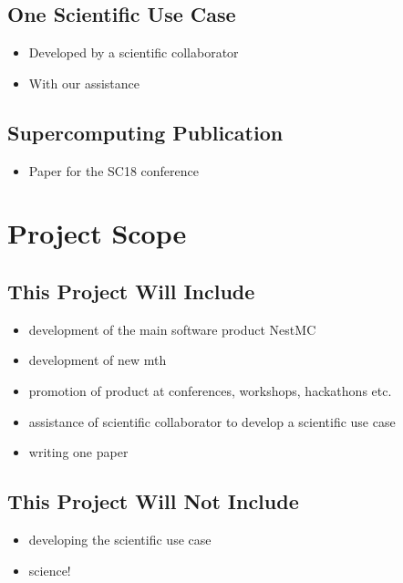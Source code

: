 \documentclass[11pt,a4paper]{article}
\begin{document}
\subsection{One Scientific Use Case}

\begin{itemize}
    \item   Developed by a scientific collaborator
    \item   With our assistance
\end{itemize}

\subsection{Supercomputing Publication}

\begin{itemize}
    \item   Paper for the SC18 conference
\end{itemize}

\section{Project Scope}
\subsection{This Project Will Include}

\begin{itemize}
    \item development of the main software product NestMC
    \item development of new mth
    \item promotion of product at conferences, workshops, hackathons etc.
    \item assistance of scientific collaborator to develop a scientific use case
    \item writing one paper
\end{itemize}

\subsection{This Project Will Not Include}

\begin{itemize}
    \item developing the scientific use case
    \item science!
\end{itemize}
\end{document}
